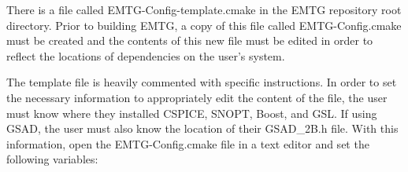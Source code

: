 
There is a file called EMTG-Config-template.cmake in the \ac{EMTG} repository root directory. Prior to building \ac{EMTG}, a copy of this file called EMTG-Config.cmake must be created and the contents of this new file must be edited in order to reflect the locations of dependencies on the user's system.

\noindent The template file is heavily commented with specific instructions. In order to set the necessary information to appropriately edit the content of the file, the user must know where they installed CSPICE, \ac{SNOPT}, Boost, and \ac{GSL}. If using \ac{GSAD}, the user must also know the location of their GSAD\_2B.h file. With this information, open the EMTG-Config.cmake file in a text editor and set the following variables:

